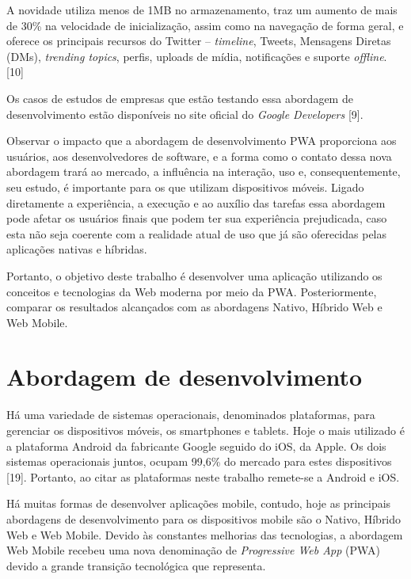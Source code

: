 \begin{citacaodireta}
A novidade utiliza menos de 1MB no armazenamento, traz um aumento de mais de 30\% na velocidade de inicialização, assim como na navegação de forma geral, e oferece os principais recursos do Twitter – \textit{timeline}, Tweets, Mensagens Diretas (DMs), \textit{trending topics}, perfis, uploads de mídia, notificações e suporte \textit{offline}. [10]
\end{citacaodireta}

Os casos de estudos de empresas que estão testando essa abordagem de desenvolvimento estão disponíveis no site oficial do \textit{Google Developers} [9].

Observar o impacto que a abordagem de desenvolvimento PWA proporciona aos usuários, aos desenvolvedores de software, e a forma como o contato dessa nova abordagem trará ao mercado, a influência na interação, uso e, consequentemente, seu estudo, é importante para os que utilizam dispositivos móveis. Ligado diretamente a experiência, a execução e ao auxílio das tarefas essa abordagem pode afetar os usuários finais que podem ter sua experiência prejudicada, caso esta não seja coerente com a realidade atual de uso que já são oferecidas pelas aplicações nativas e híbridas.

Portanto, o objetivo deste trabalho é desenvolver uma aplicação utilizando os conceitos e tecnologias da Web moderna por meio da PWA. Posteriormente, comparar os resultados alcançados com as abordagens Nativo, Híbrido Web e Web Mobile.


\section{\esp Abordagem de desenvolvimento}

Há uma variedade de sistemas operacionais, denominados plataformas, para gerenciar os dispositivos móveis, os smartphones e tablets. Hoje o mais utilizado é a plataforma Android da fabricante Google seguido do iOS, da Apple. Os dois sistemas operacionais juntos, ocupam 99,6\% do mercado para estes dispositivos [19]. Portanto, ao citar as plataformas neste trabalho remete-se a Android e iOS.

Há muitas formas de desenvolver aplicações mobile, contudo, hoje as principais abordagens de desenvolvimento para os dispositivos mobile são o Nativo, Híbrido Web e Web Mobile. Devido às constantes melhorias das tecnologias, a abordagem Web Mobile recebeu uma nova denominação de \textit{Progressive Web App} (PWA) devido a grande transição  tecnológica que representa.

